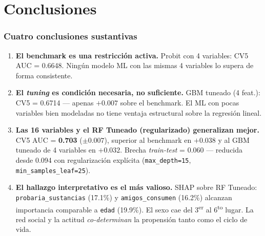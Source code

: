 \section{Conclusiones}

\begin{frame}
\frametitle{Cuatro conclusiones sustantivas}
\small
\begin{enumerate}
    \item \textbf{El benchmark es una restricción activa.} Probit con 4 variables: CV5 AUC = 0.6648. Ningún modelo ML con las mismas 4 variables lo supera de forma consistente.

    \vspace{0.15cm}
    \item \textbf{El \textit{tuning} es condición necesaria, no suficiente.} GBM tuneado (4 feat.): CV5 = 0.6714 — apenas $+0.007$ sobre el benchmark. El ML con pocas variables bien modeladas no tiene ventaja estructural sobre la regresión lineal.

    \vspace{0.15cm}
    \item \textbf{Las 16 variables y el RF Tuneado (regularizado) generalizan mejor.} CV5 AUC = \textbf{0.703} ($\pm 0.007$), superior al benchmark en $+0.038$ y al GBM tuneado de 4 variables en $+0.032$. Brecha \textit{train-test} = 0.060 — reducida desde 0.094 con regularización explícita (\texttt{max\_depth=15}, \texttt{min\_samples\_leaf=25}).

    \vspace{0.15cm}
    \item \textbf{El hallazgo interpretativo es el más valioso.} SHAP sobre RF Tuneado: \texttt{probaria\_sustancias} (17.1\%) y \texttt{amigos\_consumen} (16.2\%) alcanzan importancia comparable a \texttt{edad} (19.9\%). El sexo cae del 3\textsuperscript{er} al 6\textsuperscript{to} lugar. La red social y la actitud \textit{co-determinan} la propensión tanto como el ciclo de vida.
\end{enumerate}
\end{frame}

